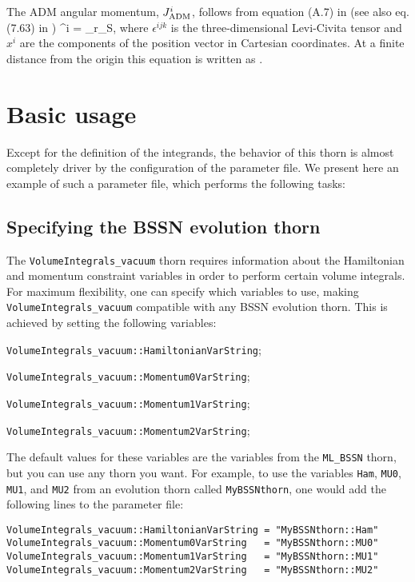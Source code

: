 The ADM angular momentum, $J_{\rm ADM}^{i}$, follows from equation (A.7) in
\cite{alcubierre2008introduction} (see also eq. (7.63) in
\cite{gourgoulhon20073+})
\beq
\Jadm^{i} = \lim_{r\to\infty}\oint_{S},
\eeq
where $\epsilon^{ijk}$ is the three-dimensional Levi-Civita tensor and
$x^{i}$ are the components of the position vector in Cartesian coordinates.
At a finite distance from the origin this equation is written as
\beq
{}\; .
\eeq


\section{Basic usage}
\label{sec:basic_usage}

Except for the definition of the integrands, the behavior of this thorn
is almost completely driver by the configuration of the parameter file.
We present here an example of such a parameter file, which performs the
following tasks:

\subsection{Specifying the BSSN evolution thorn}
\label{sec:evolution_thorn}

The \texttt{VolumeIntegrals\_vacuum} thorn requires information about the
Hamiltonian and momentum constraint variables in order to perform certain
volume integrals. For maximum flexibility, one can specify which variables
to use, making \texttt{VolumeIntegrals\_vacuum} compatible with any BSSN
evolution thorn. This is achieved by setting the following variables:
\begin{packed_enumerate}
\item \verb|VolumeIntegrals_vacuum::HamiltonianVarString|;
\item \verb|VolumeIntegrals_vacuum::Momentum0VarString|;
\item \verb|VolumeIntegrals_vacuum::Momentum1VarString|;
\item \verb|VolumeIntegrals_vacuum::Momentum2VarString|;
\end{packed_enumerate}
The default values for these variables are the variables from the
\texttt{ML\_BSSN} thorn, but you can use any thorn you want. For example,
to use the variables \verb|Ham|, \verb|MU0|, \verb|MU1|, and \verb|MU2| from
an evolution thorn called \texttt{MyBSSNthorn}, one would add the following
lines to the parameter file:
\begin{verbatim}
VolumeIntegrals_vacuum::HamiltonianVarString = "MyBSSNthorn::Ham"
VolumeIntegrals_vacuum::Momentum0VarString   = "MyBSSNthorn::MU0"
VolumeIntegrals_vacuum::Momentum1VarString   = "MyBSSNthorn::MU1"
VolumeIntegrals_vacuum::Momentum2VarString   = "MyBSSNthorn::MU2"
\end{verbatim}

